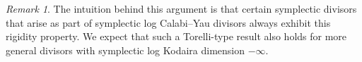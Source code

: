 \documentclass[11pt]{article}
\theoremstyle{definition}
\theoremstyle{remark}
\newtheorem{remark}[theorem]{Remark}
\newtheorem{claim}[theorem]{Claim}
\newcommand{\st}{\mathcal{S}}
\newcommand{\e}{\mathfrak{e}}
\begin{document}
\begin{remark}
  The intuition behind this argument is that certain symplectic divisors that arise as part of symplectic log Calabi--Yau divisors always exhibit this rigidity property. We expect that such a Torelli-type result also holds for more general divisors with symplectic log Kodaira dimension $-\infty$.
\end{remark}




\end{document}

